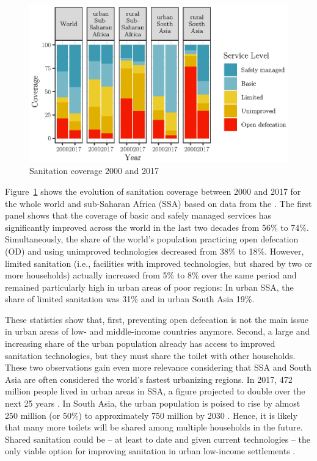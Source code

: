 \documentclass[natbib]{svjour3}                     %
\begin{document}
\begin{figure}[ht]
    \centering
    \includegraphics[width=\textwidth]{figures/coverage_plot.eps}
    \caption{Sanitation coverage 2000 and 2017 \citep{JMP2018}}
    \label{fig:coverage}
\end{figure}

Figure~\ref{fig:coverage} shows the evolution of sanitation coverage between 2000 and 2017 for the whole world and sub-Saharan Africa (SSA) based on data from the \cite{JMP2018}. The first panel shows that the coverage of basic and safely managed services has significantly improved across the world in the last two decades from 56\% to 74\%. Simultaneously, the share of the world's population practicing open defecation (OD) and using unimproved technologies decreased from 38\% to 18\%. However, limited sanitation (i.e., facilities with improved technologies, but shared by two or more households) actually increased from 5\% to 8\% over the same period and remained particularly high in urban areas of poor regions: In urban SSA, the share of limited sanitation was 31\% and in urban South Asia 19\%.

These statistics show that, first, preventing open defecation is not the main issue in urban areas of low- and middle-income countries anymore. Second, a large and increasing share of the urban population already has access to improved sanitation technologies, but they must share the toilet with other households. These two observations gain even more relevance considering that SSA and South Asia are often considered the world's fastest urbanizing regions. In 2017, 472 million people lived in urban areas in SSA, a figure projected to double over the next 25 years \citep{Lall2017}. In South Asia, the urban population is poised to rise by almost 250 million (or 50\%) to approximately 750 million by 2030 \citep{Ellis2015, TheWorldBank2020}. Hence, it is likely that many more toilets will be shared among multiple households in the future. Shared sanitation could be -- at least to date and given current technologies -- the only viable option for improving sanitation in urban low-income settlements \citep{Schouten2010}.
\end{document}
